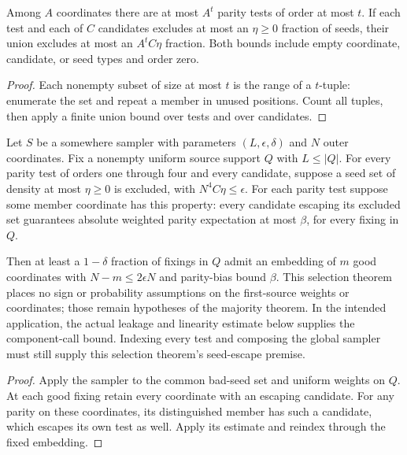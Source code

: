 \begin{theorem}
  \label{thm:lowerbounds-algebraic-parity-bad-seeds}
  \leanok
  Among $A$ coordinates there are at most $A^t$ parity tests of order
  at most $t$. If each test and each of $C$ candidates excludes at most
  an $\eta\ge0$ fraction of seeds, their union excludes at most an
  $A^tC\eta$ fraction. Both bounds include empty coordinate, candidate,
  or seed types and order zero.
\end{theorem}
\begin{proof}
  \leanok
  Each nonempty subset of size at most $t$ is the range of a $t$-tuple:
  enumerate the set and repeat a member in unused positions. Count all
  tuples, then apply a finite union bound over tests and over candidates.
\end{proof}

\begin{theorem}
  \label{thm:lowerbounds-algebraic-parity-selection}
  \leanok
  Let $S$ be a somewhere sampler with parameters $(L,\epsilon,\delta)$
  and $N$ outer coordinates. Fix a nonempty uniform source support $Q$
  with $L\le|Q|$. For every parity test of orders one through four
  and every candidate, suppose a seed set of density at most $\eta\ge0$
  is excluded, with $N^4C\eta\le\epsilon$.
  For each parity test suppose some member coordinate has this property:
  every candidate escaping its excluded set guarantees absolute weighted
  parity expectation at most $\beta$, for every fixing in $Q$.

  Then at least a $1-\delta$ fraction of fixings in $Q$ admit an
  embedding of $m$ good coordinates with $N-m\le2\epsilon N$ and
  parity-bias bound $\beta$. This selection theorem places no sign or
  probability assumptions on the first-source weights or coordinates;
  those remain hypotheses of the majority theorem. In the intended
  application, the actual leakage and linearity estimate below supplies
  the component-call bound. Indexing every test and composing the global
  sampler must still supply this selection theorem's seed-escape premise.
\end{theorem}
\begin{proof}
  \leanok
  Apply the sampler to the common bad-seed set and uniform weights on
  $Q$. At each good fixing retain every coordinate with an escaping
  candidate. For any parity on these coordinates, its distinguished
  member has such a candidate, which escapes its own test as well.
  Apply its estimate and reindex through the fixed embedding.
\end{proof}

